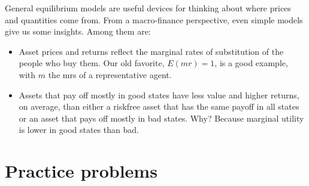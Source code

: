 \documentclass[11pt]{article}
\begin{document}
General equilibrium models are useful devices for thinking
about where prices and quantities come from.
From a macro-finance perspective,
even simple models give us some insights.
Among them are:
%
\begin{itemize}
\item Asset prices and returns reflect the marginal rates of substitution
of the people who buy them.
Our old favorite, $E(mr) = 1$, is a good example, with $m$
the mrs of a representative agent.
\item %
Assets that pay off mostly in good states have less value
and higher returns, on average,
than either a riskfree asset that has the same payoff in all states
or an asset that pays off mostly in bad states.
Why?  Because marginal utility is lower in good states than bad.
\end{itemize}

\section*{Practice problems}
\end{document}
